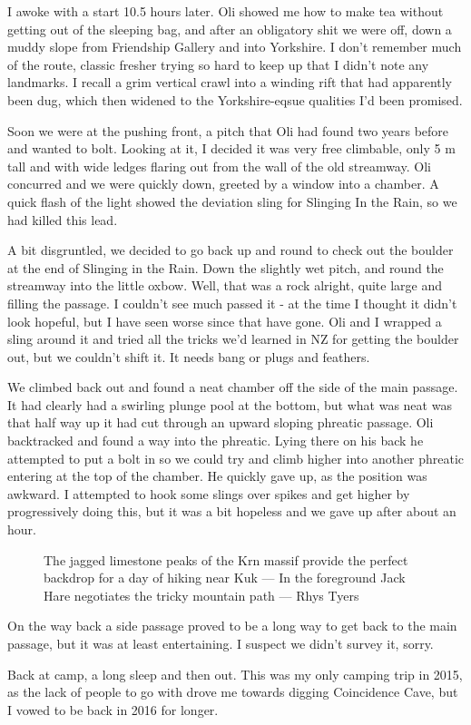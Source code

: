 I awoke with a start 10.5 hours later. Oli showed me how to make tea without getting out of the sleeping bag, and after an obligatory shit we were off, down a muddy slope from Friendship Gallery and into Yorkshire. I don’t remember much of the route, classic fresher trying so hard to keep up that I didn’t note any landmarks. I recall a grim vertical crawl into a winding rift that had apparently been dug, which then widened to the Yorkshire-eqsue qualities I’d been promised.

Soon we were at the pushing front, a pitch that Oli had found two years before and wanted to bolt. Looking at it, I decided it was very free climbable, only 5 m tall and with wide ledges flaring out from the wall of the old streamway. Oli concurred and we were quickly down, greeted by a window into a chamber. A quick flash of the light showed the deviation sling for Slinging In the Rain, so we had killed this lead. 

A bit disgruntled, we decided to go back up and round to check out the boulder at the end of Slinging in the Rain. Down the slightly wet pitch, and round the streamway into the little oxbow. Well, that was a rock alright, quite large and filling the passage. I couldn’t see much passed it - at the time I thought it didn’t look hopeful, but I have seen worse since that have gone. Oli and I wrapped a sling around it and tried all the tricks we’d learned in NZ for getting the boulder out, but we couldn’t shift it. It needs bang or plugs and feathers.

We climbed back out and found a neat chamber off the side of the main passage. It had clearly had a swirling plunge pool at the bottom, but what was neat was that half way up it had cut through an upward sloping phreatic passage. Oli backtracked and found a way into the phreatic. Lying there on his back he attempted to put a bolt in so we could try and climb higher into another phreatic entering at the top of the chamber. He quickly gave up, as the position was awkward. I attempted to hook some slings over spikes and get higher by progressively doing this, but it was a bit hopeless and we gave up after about an hour.

\begin{figure}[t!]
\checkoddpage \ifoddpage \forcerectofloat \else \forceversofloat \fi
\centering
{}
\caption{The jagged limestone peaks of the Krn massif provide the perfect backdrop for a day of hiking near Kuk --- In the foreground Jack Hare negotiates the tricky mountain path --- Rhys Tyers}
\label{kukjack}
\end{figure}

On the way back a side passage proved to be a long way to get back to the main passage, but it was at least entertaining. I suspect we didn’t survey it, sorry.

Back at camp, a long sleep and then out. This was my only camping trip in 2015, as the lack of people to go with drove me towards digging Coincidence Cave, but I vowed to be back in 2016 for longer.

